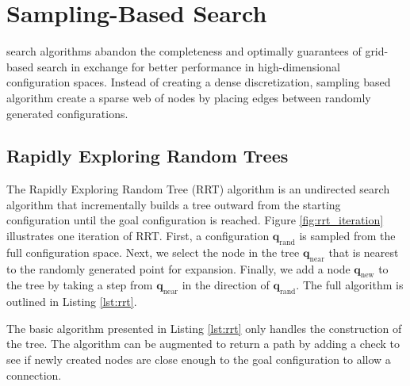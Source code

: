 \section{Sampling-Based Search}

 search algorithms abandon the completeness and
optimally guarantees of grid-based search in exchange for better
performance in high-dimensional configuration spaces.  Instead of
creating a dense discretization, sampling based algorithm create a
sparse web of nodes by placing edges between randomly generated
configurations.

\subsection{Rapidly Exploring Random Trees}

The Rapidly Exploring Random Tree (RRT) algorithm is an undirected
search algorithm that incrementally builds a tree outward from the
starting configuration until the goal configuration is reached.
Figure \ref{fig:rrt_iteration} illustrates one iteration of RRT.
First, a configuration $\mathbf{q}_{\text{rand}}$ is sampled from the
full configuration space.  Next, we select the node in the tree
$\mathbf{q}_{\text{near}}$ that is nearest to the randomly generated
point for expansion.  Finally, we add a node $\mathbf{q}_{\text{new}}$
to the tree by taking a step from $\mathbf{q}_{\text{near}}$ in the
direction of $\mathbf{q}_{\text{rand}}$.  The full algorithm is
outlined in Listing \ref{lst:rrt}.

The basic algorithm presented in Listing \ref{lst:rrt} only handles
the construction of the tree.  The algorithm can be augmented to
return a path by adding a check to see if newly created nodes are
close enough to the goal configuration to allow a connection.

